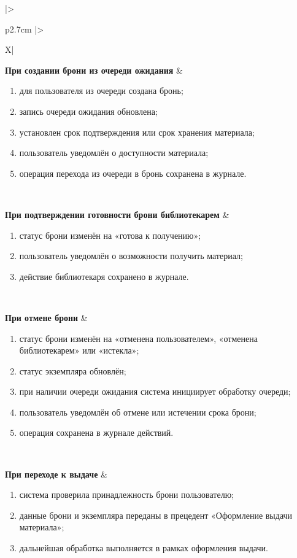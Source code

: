 \documentclass[12pt,a4paper]{article}
\begin{document}
\begin{xltabular}{\textwidth}{
				|>{\raggedright\arraybackslash}p{2.7cm}
				|>{\raggedright\arraybackslash}X|
			}
			\textbf{При создании брони из очереди ожидания} &
			\begin{enumerate}
				\item для пользователя из очереди создана бронь;
				\item запись очереди ожидания обновлена;
				\item установлен срок подтверждения или срок хранения материала;
				\item пользователь уведомлён о доступности материала;
				\item операция перехода из очереди в бронь сохранена в журнале.
			\end{enumerate} \\
			\hline
			
			\textbf{При подтверждении готовности брони библиотекарем} &
			\begin{enumerate}
				\item статус брони изменён на «готова к получению»;
				\item пользователь уведомлён о возможности получить материал;
				\item действие библиотекаря сохранено в журнале.
			\end{enumerate} \\
			\hline
			
			\textbf{При отмене брони} &
			\begin{enumerate}
				\item статус брони изменён на «отменена пользователем»,
				«отменена библиотекарем» или «истекла»;
				\item статус экземпляра обновлён;
				\item при наличии очереди ожидания система инициирует обработку
				очереди;
				\item пользователь уведомлён об отмене или истечении срока брони;
				\item операция сохранена в журнале действий.
			\end{enumerate} \\
			\hline
			
			\textbf{При переходе к выдаче} &
			\begin{enumerate}
				\item система проверила принадлежность брони пользователю;
				\item данные брони и экземпляра переданы в прецедент
				«Оформление выдачи материала»;
				\item дальнейшая обработка выполняется в рамках оформления выдачи.
			\end{enumerate} \\
			\hline
			

\end{xltabular}
\end{document}
